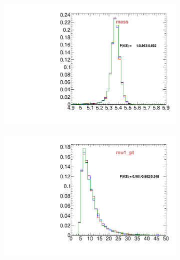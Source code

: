 \begin{figure}
\begin{subfigure}[b]{0.2\textwidth}
                \includegraphics[width=\textwidth]{Figures/VariablesComparison/MC_barrel_figs_3h/mass}
                \label{fig:MC_barrel_mass_3h}
        \end{subfigure}
        \begin{subfigure}[b]{0.2\textwidth}
                \centering
                \includegraphics[width=\textwidth]{Figures/VariablesComparison/MC_barrel_figs_3h/mu1_pt}
                \label{fig:MC_barrel_mu1_pt_3h}
        \end{subfigure}
        \begin{subfigure}[b]{0.2\textwidth}
                \centering

\end{subfigure}
\end{figure}

